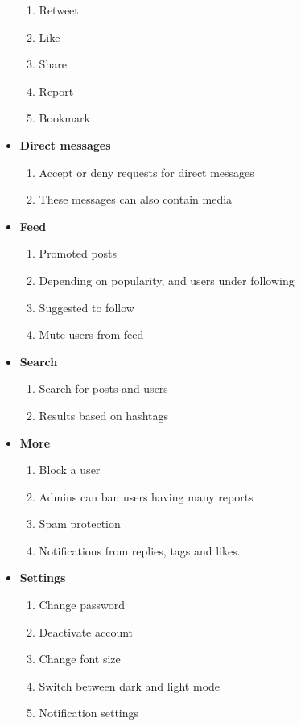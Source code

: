 \documentclass[journal,12pt, onecolumn]{IEEEtran}
\begin{document}
\begin{itemize}
\begin{enumerate}
    \item Retweet
    \item Like 
    \item Share
    \item Report
    \item Bookmark
\end{enumerate}
%
\item \textbf{Direct messages}
\begin{enumerate}
    \item Accept or deny requests for direct messages
    \item These messages can also contain media
\end{enumerate}
%
\item \textbf{Feed} 
\begin{enumerate}
    \item Promoted posts
    \item Depending on popularity, and users under following
    \item Suggested to follow
    \item Mute users from feed
\end{enumerate}
%
\item \textbf{Search}
\begin{enumerate}
    \item Search for posts and users
    \item Results based on hashtags 
\end{enumerate}
%
\item \textbf{More}
\begin{enumerate}
    \item Block a user
    \item Admins can ban users having many reports
    \item Spam protection
    \item Notifications from replies, tags and likes.
\end{enumerate}
\item \textbf{Settings}
%
\begin{enumerate}
    \item Change password
    \item Deactivate account
    \item Change font size
    \item Switch between dark and light mode
    \item Notification settings
\end{enumerate}
\end{itemize}
\end{document}
